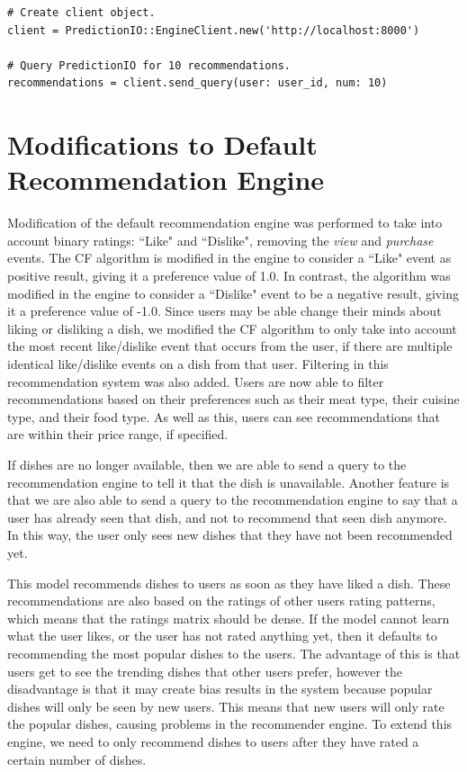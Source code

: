 \begin{lstlisting} 
# Create client object.
client = PredictionIO::EngineClient.new('http://localhost:8000')

# Query PredictionIO for 10 recommendations.
recommendations = client.send_query(user: user_id, num: 10)
\end{lstlisting}

\section{Modifications to Default Recommendation Engine}

Modification of the default recommendation engine was performed to take into account binary ratings: ``Like" and ``Dislike", removing the \textit{view} and \textit{purchase} events. The CF algorithm is modified in the engine to consider a ``Like" event as positive result, giving it a preference value of 1.0. In contrast, the algorithm was modified in the engine to consider a ``Dislike" event to be a negative result, giving it a preference value of -1.0. Since users may be able change their minds about liking or disliking a dish, we modified the CF algorithm to only take into account the most recent like/dislike event that occurs from the user, if there are multiple identical like/dislike events on a dish from that user. Filtering in this recommendation system was also added. Users are now able to filter recommendations based on their preferences such as their meat type, their cuisine type, and their food type. As well as this, users can see recommendations that are within their price range, if specified. 

If dishes are no longer available, then we are able to send a query to the recommendation engine to tell it that the dish is unavailable. Another feature is that we are also able to send a query to the recommendation engine to say that a user has already seen that dish, and not to recommend that seen dish anymore. In this way, the user only sees new dishes that they have not been recommended yet.

This model recommends dishes to users as soon as they have liked a dish. These recommendations are also based on the ratings of other users rating patterns, which means that the ratings matrix should be dense. If the model cannot learn what the user likes, or the user has not rated anything yet, then it defaults to recommending the most popular dishes to the users. The advantage of this is that users get to see the trending dishes that other users prefer, however the disadvantage is that it may create bias results in the system because popular dishes will only be seen by new users. This means that new users will only rate the popular dishes, causing problems in the recommender engine. To extend this engine, we need to only recommend dishes to users after they have rated a certain number of dishes. 

